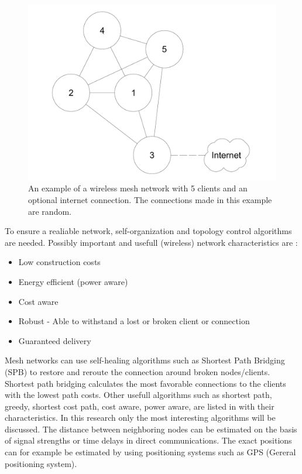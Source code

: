 \documentclass[10pt,a4paper]{article}
\begin{document}
\begin{figure}[H]
   \centering
   \includegraphics[width=1\textwidth]{WMN}
   \caption{An example of a wireless mesh network with 5 clients and an optional internet connection. The connections made in this example are random.}
   \label{fig:WMN}
\end{figure}

To ensure a realiable network, self-organization and topology control algorithms are needed.\cite{WMN1} Possibly important and usefull (wireless) network characteristics are \cite{position-based}:
\begin{itemize}
\setlength\itemsep{0em}
    \item Low construction costs
    \item Energy efficient (power aware)
    \item Cost aware
    \item Robust - Able to withstand a lost or broken client or connection
    \item Guaranteed delivery
\end{itemize}

Mesh networks can use self-healing algorithms such as Shortest Path Bridging (SPB) to restore and reroute the connection around broken nodes/clients. Shortest path bridging calculates the most favorable connections to the clients with the lowest path costs. \cite{SPB} Other usefull algorithms such as shortest path, greedy, shortest cost path, cost aware, power aware, are listed in \cite{position-based} with their characteristics. In this research only the most interesting algorithms will be discussed. The distance between neighboring nodes can be estimated on the basis of signal strengths or time delays in direct communications. The exact positions can for example be estimated by using positioning systems such as GPS (Gereral positioning system). \cite{locationsystemsforubiquitouscomputing} 
\end{document}
